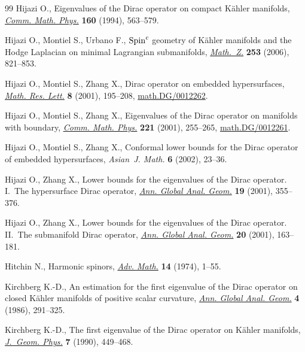 \documentclass[10pt,a4paper]{amsart}
\numberwithin{equation}{section}
\theoremstyle{definition}
\begin{document}
\begin{thebibliography}{99}
Hijazi O., Eigenvalues of the {D}irac operator on compact {K}\"ahler manifolds,
  \href{http://dx.doi.org/10.1007/BF02173430}{\textit{Comm. Math. Phys.}} \textbf{160} (1994), 563--579.

Hijazi O., Montiel S., Urbano F., {${\rm Spin}^c$} geometry of {K}\"ahler
  manifolds and the {H}odge {L}aplacian on minimal {L}agrangian submanifolds,
  \href{http://dx.doi.org/10.1007/s00209-006-0936-8}{\textit{Math.~Z.}} \textbf{253} (2006), 821--853.

Hijazi O., Montiel S., Zhang X., Dirac operator on embedded hypersurfaces,
  \href{http://dx.doi.org/10.4310/MRL.2001.v8.n2.a8}{\textit{Math. Res. Lett.}} \textbf{8} (2001), 195--208,
  \href{http://arxiv.org/abs/math.DG/0012262}{math.DG/0012262}.

Hijazi O., Montiel S., Zhang X., Eigenvalues of the {D}irac operator on
  manifolds with boundary, \href{http://dx.doi.org/10.1007/s002200100475}{\textit{Comm. Math. Phys.}} \textbf{221} (2001),
  255--265, \href{http://arxiv.org/abs/math.DG/0012261}{math.DG/0012261}.

Hijazi O., Montiel S., Zhang X., Conformal lower bounds for the {D}irac
  operator of embedded hypersurfaces, \textit{Asian~J. Math.} \textbf{6}
  (2002), 23--36.

Hijazi O., Zhang X., Lower bounds for the eigenvalues of the {D}irac operator.
  {I}.~{T}he hypersurface {D}irac operator, \href{http://dx.doi.org/10.1023/A:1010749808691}{\textit{Ann. Global Anal. Geom.}}
  \textbf{19} (2001), 355--376.

Hijazi O., Zhang X., Lower bounds for the eigenvalues of the {D}irac operator.
  {II}.~{T}he submanifold {D}irac operator, \href{http://dx.doi.org/10.1023/A:1011663603699}{\textit{Ann. Global Anal. Geom.}}
  \textbf{20} (2001), 163--181.

Hitchin N., Harmonic spinors, \href{http://dx.doi.org/10.1016/0001-8708(74)90021-8}{\textit{Adv. Math.}} \textbf{14} (1974), 1--55.

Kirchberg K.-D., An estimation for the f\/irst eigenvalue of the {D}irac operator
  on closed {K}\"ahler manifolds of positive scalar curvature, \href{http://dx.doi.org/10.1007/BF00128050}{\textit{Ann.
  Global Anal. Geom.}} \textbf{4} (1986), 291--325.

Kirchberg K.-D., The f\/irst eigenvalue of the {D}irac operator on {K}\"ahler
  manifolds, \href{http://dx.doi.org/10.1016/0393-0440(90)90001-J}{\textit{J.~Geom. Phys.}} \textbf{7} (1990), 449--468.


\end{thebibliography}
\end{document}

